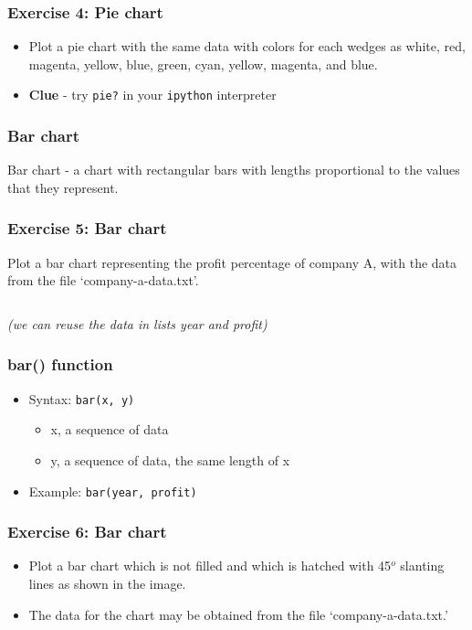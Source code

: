 \documentclass[17pt,compress]{beamer}
\begin{document}
\begin{frame}[fragile]
\frametitle{Exercise 4: Pie chart}
\label{sec-11}
\begin{itemize}
\item Plot a pie chart with the same data with colors for each wedges as white, red,
magenta, yellow, blue, green, cyan, yellow, magenta, and blue.\pause
\item \textbf{Clue} - try \texttt{pie?} in your \texttt{ipython} interpreter
\end{itemize}
\end{frame}
\begin{frame}
\frametitle{Bar chart}
\label{sec-12}
Bar chart - a chart with rectangular bars with lengths proportional
to the values that they represent.
\end{frame}
\begin{frame}[fragile]
\frametitle{Exercise 5: Bar chart}
\label{sec-13}
Plot a bar chart representing the profit percentage of company A, with the data
from the file `company-a-data.txt'.
\begin{verbatim}
\end{verbatim}
\emph{(we can reuse the data in lists year and profit)}
\end{frame}
\begin{frame}[fragile]
\frametitle{bar() function}
\label{sec-14}
\begin{itemize}
\item Syntax: \texttt{bar(x, y)}\pause
\begin{itemize}
\item x, a sequence of data\pause
\item y, a sequence of data, the same length of x\pause
\end{itemize}
\item Example: \texttt{bar(year, profit)}
\end{itemize}
\end{frame}
\begin{frame}
\frametitle{Exercise 6: Bar chart}
\label{sec-15}
\begin{itemize}
\item Plot a bar chart which is not filled and which is hatched with
45$^o$ slanting lines as shown in the image.
\item The data for the chart may be obtained from the file `company-a-data.txt.'
\end{itemize}
\end{frame}
\end{document}
